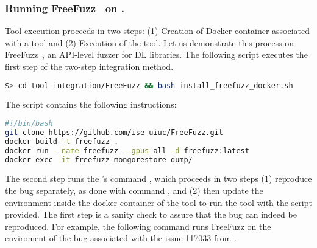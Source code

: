 \documentclass[sigconf,screen]{acmart}
\begin{document}

\subsubsection{Running FreeFuzz~\cite{wei2022free} on \tname.}

Tool execution proceeds in two steps: (1) Creation of Docker container
associated with a tool and (2) Execution of the tool.  Let us
demonstrate this process on FreeFuzz~\cite{wei2022free}, an API-level
fuzzer for DL libraries. The following script executes the first step
of the two-step integration method.




\begin{lstlisting}[language=bash]
$> cd tool-integration/FreeFuzz && bash install_freefuzz_docker.sh
\end{lstlisting}

\noindent
The script  contains the
following instructions:

\begin{lstlisting}[language=bash]
#!/bin/bash
git clone https://github.com/ise-uiuc/FreeFuzz.git
docker build -t freefuzz .
docker run --name freefuzz --gpus all -d freefuzz:latest
docker exec -it freefuzz mongorestore dump/
\end{lstlisting}


The second step runs the \tname's command , which
proceeds in two steps (1) reproduce the bug separately, as done with
command , and (2) then update the environment inside
the docker container of the tool to run the tool with the script
provided. The first step is a
sanity check to assure that the bug can indeed be reproduced. For
example, the following command runs FreeFuzz on the enviroment of the
bug associated with the issue 117033 from \torch.
\end{document}
